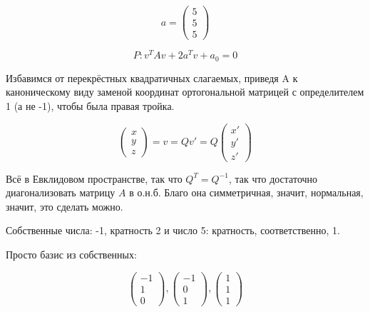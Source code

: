 \documentclass[12pt, a4paper]{article}
\begin{document}
    \begin{equation}
        a = \begin{pmatrix}
            5 \\ 5 \\ 5
        \end{pmatrix}
    \end{equation}

    \begin{equation}
        P: v^T A v + 2 a^T v + a_0 = 0
    \end{equation}

    Избавимся от перекрёстных квадратичных слагаемых, приведя A к каноническому виду заменой координат ортогональной матрицей с определителем 1 (а не -1), 
    чтобы была правая тройка.

    \begin{equation}
        \begin{pmatrix}
            x \\ y \\ z
        \end{pmatrix} = v = Q v' = Q \begin{pmatrix}
            x' \\ y' \\ z'
        \end{pmatrix}
    \end{equation}

    Всё в Евклидовом пространстве, так что $Q^T = Q^{-1}$, так что достаточно диагонализовать матрицу $A$ в о.н.б. 
    Благо она симметричная, значит, нормальная, значит, это сделать можно.

    Собственные числа: -1, кратность 2 и число 5: кратность, соответственно, 1.

    Просто базис из собственных: 
    
    \begin{equation}
        \begin{pmatrix}
            -1 \\ 1 \\ 0
        \end{pmatrix}, \begin{pmatrix}
            -1 \\ 0 \\ 1
        \end{pmatrix}, \begin{pmatrix}
            1 \\ 1 \\ 1
        \end{pmatrix}
    \end{equation}
\end{document}
